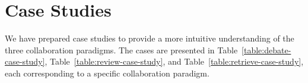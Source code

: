 \section{Case Studies}
\label{appendix:cases}

We have prepared case studies to provide a more intuitive understanding of the three collaboration paradigms. 
The cases are presented in Table~\ref{table:debate-case-study}, Table~\ref{table:review-case-study}, and Table~\ref{table:retrieve-case-study}, 
each corresponding to a specific collaboration paradigm.





